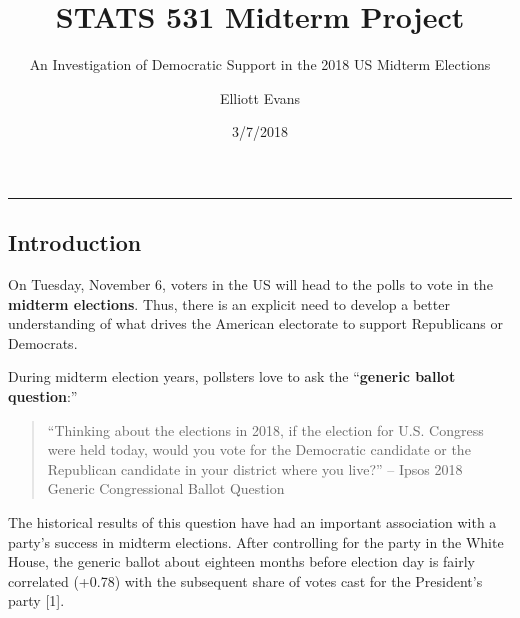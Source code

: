 \documentclass[]{article}
\title{STATS 531 Midterm Project}
\subtitle{An Investigation of Democratic Support in the 2018 US Midterm Elections}
\author{Elliott Evans}
\date{3/7/2018}
\begin{document}
\maketitle

{
\setcounter{tocdepth}{2}
\tableofcontents
}
\newcommand{\DEF}{\overset{\text{def}}{=}}
\newcommand{\PP}{\mathbb{P}}
\newcommand{\RR}{\mathbb{R}}
\newcommand{\ZZ}{\mathbb{Z}}
\newcommand{\EE}{\mathbb{E}}
\newcommand{\IND}{\mathbbm{1}}
\newcommand{\var}{\text{Var}}
\newcommand{\cov}{\text{Cov}}
\newcommand{\logit}{\text{logit}}
\newcommand{\n}{\newline}
\newcommand\loglik{\ell}
\newcommand\R{\mathbb{R}}
\newcommand\data[1]{#1^*}
\newcommand\estimate[1]{\data{#1}}
\newcommand\params{\, ; \,}
\newcommand\transpose{\scriptsize{T}}
\newcommand\eqspace{\quad\quad\quad}
\newcommand\lik{\mathscr{L}}
\newcommand\profileloglik[1]{\ell^\mathrm{profile}_#1}
\newcommand\ar{\phi}
\newcommand\ma{\psi}

\begin{center}\rule{0.5\linewidth}{\linethickness}\end{center}

\subsection{Introduction}\label{introduction}

On Tuesday, November 6, voters in the US will head to the polls to vote
in the \textbf{midterm elections}. Thus, there is an explicit need to
develop a better understanding of what drives the American electorate to
support Republicans or Democrats.

During midterm election years, pollsters love to ask the
``\textbf{generic ballot question}:''

\begin{quote}
``Thinking about the elections in 2018, if the election for U.S.
Congress were held today, would you vote for the Democratic candidate or
the Republican candidate in your district where you live?'' -- Ipsos
2018 Generic Congressional Ballot Question
\end{quote}

The historical results of this question have had an important
association with a party's success in midterm elections. After
controlling for the party in the White House, the generic ballot about
eighteen months before election day is fairly correlated (+0.78) with
the subsequent share of votes cast for the President's party {[}1{]}.
\end{document}

